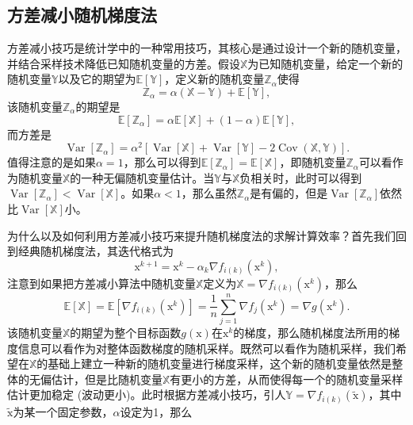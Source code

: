 \subsection{方差减小随机梯度法}
方差减小技巧是统计学中的一种常用技巧，其核心是通过设计一个新的随机变量，并结合采样技术降低已知随机变量的方差\cite{SVRG}。假设$\mathbb{X}$为已知随机变量，给定一个新的随机变量$\mathbb{Y}$以及它的期望为$\mathbb{E}[\mathbb{Y}]$，定义新的随机变量$\mathbb{Z}_{\alpha}$使得
\begin{equation}
    \mathbb{Z}_{\alpha}=\alpha(\mathbb{X}-\mathbb{Y})+\mathbb{E}[\mathbb{Y}],
    \nonumber
\end{equation}
该随机变量$\mathbb{Z}_{\alpha}$的期望是
\begin{equation}
    \mathbb{E}\left[\mathbb{Z}_{\alpha}\right]=\alpha \mathbb{E}[\mathbb{X}]+(1-\alpha) \mathbb{E}[\mathbb{Y}] ,
    \nonumber
\end{equation}
而方差是
\begin{equation}
    \operatorname{Var}\left[\mathbb{Z}_{\alpha}\right]=\alpha^{2}[\operatorname{Var}[\mathbb{X}]+\operatorname{Var}[\mathbb{Y}]-2 \operatorname{Cov}(\mathbb{X}, \mathbb{Y})] .
    \nonumber
\end{equation}
值得注意的是如果$\alpha=1$，那么可以得到$\mathbb{E}\left[\mathbb{Z}_{\alpha}\right]=\mathbb{E}[\mathbb{X}]$，即随机变量$\mathbb{Z}_{\alpha}$可以看作为随机变量$\mathbb{X}$的一种无偏随机变量估计。当$\mathbb{Y}$与$\mathbb{X}$负相关时，此时可以得到$\operatorname{Var}\left[\mathbb{Z}_{\alpha}\right]<\operatorname{Var}[\mathbb{X}]$。如果$\alpha<1$，那么虽然$\mathbb{Z}_{\alpha}$是有偏的，但是$\operatorname{Var}\left[\mathbb{Z}_{\alpha}\right]$依然比$\operatorname{Var}[\mathbb{X}]$小。
\par 为什么以及如何利用方差减小技巧来提升随机梯度法的求解计算效率？首先我们回到经典随机梯度法，其迭代格式为
\begin{equation}
    \mathrm{x}^{k+1}=\mathrm{x}^{k}-\alpha_{k} \nabla f_{i(k)}\left(\mathrm{x}^{k}\right) ,
    \nonumber
\end{equation}
注意到如果把方差减小算法中随机变量$\mathbb{X}$定义为$\mathbb{X}=\nabla f_{i(k)}\left(\mathrm{x}^{k}\right)$，那么
\begin{equation}
    \mathbb{E}[\mathbb{X}]=\mathbb{E}\left[\nabla f_{i(k)}\left(\mathrm{x}^{k}\right)\right]=\frac{1}{n} \sum_{j=1}^{n} \nabla f_{j}\left(\mathrm{x}^{k}\right)=\nabla g\left(\mathrm{x}^{k}\right) .
    \nonumber
\end{equation}
该随机变量$\mathbb{X}$的期望为整个目标函数$g(\mathrm{x})$在$\mathrm{x}^{k}$的梯度，那么随机梯度法所用的梯度信息可以看作为对整体函数梯度的随机采样。既然可以看作为随机采样，我们希望在$\mathbb{X}$的基础上建立一种新的随机变量进行梯度采样，这个新的随机变量依然是整体的无偏估计，但是比随机变量$\mathbb{X}$有更小的方差，从而使得每一个的随机变量采样估计更加稳定 (波动更小)。此时根据方差减小技巧，引人$\mathbb{Y}=\nabla f_{i(k)}(\tilde{\mathrm{x}})$，其中$\tilde{\mathrm{x}} $为某一个固定参数，$\alpha$设定为1，那么
